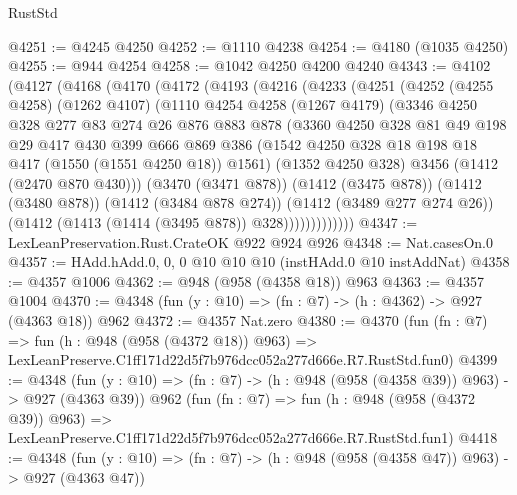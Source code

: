 \begin{lexlean}{RustStd}
\begin{coremodule}
@4251 := @4245 @4250
@4252 := @1110 @4238
@4254 := @4180 (@1035 @4250)
@4255 := @944 @4254
@4258 := @1042 @4250 @4200 @4240
@4343 := @4102
    (@4127
      (@4168
        (@4170
          (@4172
            (@4193
              (@4216
                (@4233
                  (@4251
                    (@4252
                      (@4255 @4258)
                      (@1262 @4107)
                      (@1110
                        @4254
                        @4258
                        (@1267 @4179)
                        (@3346
                          @4250
                          @328
                          @277
                          @83
                          @274
                          @26
                          @876
                          @883
                          @878
                          (@3360
                            @4250
                            @328
                            @81
                            @49
                            @198
                            @29
                            @417
                            @430
                            @399
                            @666
                            @869
                            @386
                            (@1542 @4250 @328 @18 @198 @18 @417 (@1550 (@1551 @4250 @18)) @1561)
                            (@1352 @4250 @328)
                            @3456
                            (@1412 (@2470 @870 @430)))
                          (@3470 (@3471 @878))
                          (@1412 (@3475 @878))
                          (@1412 (@3480 @878))
                          (@1412 (@3484 @878 @274))
                          (@1412 (@3489 @277 @274 @26))
                          (@1412 (@1413 (@1414 (@3495 @878)) @328)))))))))))))
@4347 := LexLeanPreservation.Rust.CrateOK @922 @924 @926
@4348 := Nat.casesOn.{0}
@4357 := HAdd.hAdd.{0, 0, 0} @10 @10 @10 (instHAdd.{0} @10 instAddNat)
@4358 := @4357 @1006
@4362 := @948 (@958 (@4358 @18)) @963
@4363 := @4357 @1004
@4370 := @4348 (fun (y : @10) => (fn : @7) -> (h : @4362) -> @927 (@4363 @18)) @962
@4372 := @4357 Nat.zero
@4380 := @4370
    (fun (fn : @7) =>
    fun (h : @948 (@958 (@4372 @18)) @963) =>
    LexLeanPreserve.C1ff171d22d5f7b976dcc052a277d666e.R7.RustStd.fun0)
@4399 := @4348
    (fun (y : @10) => (fn : @7) -> (h : @948 (@958 (@4358 @39)) @963) -> @927 (@4363 @39))
    @962
    (fun (fn : @7) =>
    fun (h : @948 (@958 (@4372 @39)) @963) =>
    LexLeanPreserve.C1ff171d22d5f7b976dcc052a277d666e.R7.RustStd.fun1)
@4418 := @4348
    (fun (y : @10) => (fn : @7) -> (h : @948 (@958 (@4358 @47)) @963) -> @927 (@4363 @47))

\end{coremodule}
\end{lexlean}
